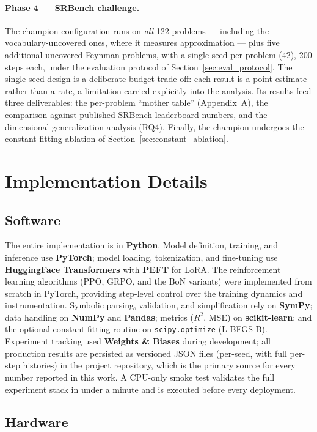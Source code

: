 \paragraph{Phase 4 --- SRBench challenge.} The champion configuration runs on \emph{all} 122 problems --- including the vocabulary-uncovered ones, where it measures approximation --- plus five additional uncovered Feynman problems, with a single seed per problem (42), 200 steps each, under the evaluation protocol of Section~\ref{sec:eval_protocol}. The single-seed design is a deliberate budget trade-off: each result is a point estimate rather than a rate, a limitation carried explicitly into the analysis. Its results feed three deliverables: the per-problem ``mother table'' (Appendix~A), the comparison against published SRBench leaderboard numbers, and the dimensional-generalization analysis (RQ4). Finally, the champion undergoes the constant-fitting ablation of Section~\ref{sec:constant_ablation}.

\section{Implementation Details}

\subsection{Software}

The entire implementation is in \textbf{Python}. Model definition, training, and inference use \textbf{PyTorch}; model loading, tokenization, and fine-tuning use \textbf{HuggingFace Transformers} with \textbf{PEFT} for LoRA. The reinforcement learning algorithms (PPO, GRPO, and the BoN variants) were implemented from scratch in PyTorch, providing step-level control over the training dynamics and instrumentation. Symbolic parsing, validation, and simplification rely on \textbf{SymPy}; data handling on \textbf{NumPy} and \textbf{Pandas}; metrics ($R^2$, MSE) on \textbf{scikit-learn}; and the optional constant-fitting routine on \texttt{scipy.optimize} (L-BFGS-B). Experiment tracking used \textbf{Weights \& Biases} during development; all production results are persisted as versioned JSON files (per-seed, with full per-step histories) in the project repository, which is the primary source for every number reported in this work. A CPU-only smoke test validates the full experiment stack in under a minute and is executed before every deployment.

\subsection{Hardware}

